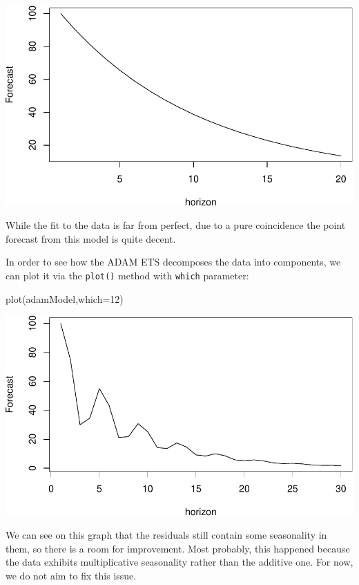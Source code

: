 \documentclass[
]{book}
\newenvironment{Shaded}{\begin{snugshade}}{\end{snugshade}}
\newcommand{\AttributeTok}[1]{\textcolor[rgb]{0.77,0.63,0.00}{#1}}
\newcommand{\DecValTok}[1]{\textcolor[rgb]{0.00,0.00,0.81}{#1}}
\newcommand{\FunctionTok}[1]{\textcolor[rgb]{0.00,0.00,0.00}{#1}}
\newcommand{\NormalTok}[1]{#1}
\theoremstyle{definition}
\theoremstyle{definition}
\theoremstyle{definition}
\theoremstyle{definition}
\theoremstyle{remark}
\begin{document}
\includegraphics{adam_files/figure-latex/unnamed-chunk-39-1.pdf}

While the fit to the data is far from perfect, due to a pure coincidence the point forecast from this model is quite decent.

In order to see how the ADAM ETS decomposes the data into components, we can plot it via the \texttt{plot()} method with \texttt{which} parameter:

\begin{Shaded}
\begin{Highlighting}[]
\FunctionTok{plot}\NormalTok{(adamModel,}\AttributeTok{which=}\DecValTok{12}\NormalTok{)}
\end{Highlighting}
\end{Shaded}

\includegraphics{adam_files/figure-latex/unnamed-chunk-40-1.pdf}

We can see on this graph that the residuals still contain some seasonality in them, so there is a room for improvement. Most probably, this happened because the data exhibits multiplicative seasonality rather than the additive one. For now, we do not aim to fix this issue.
\end{document}
